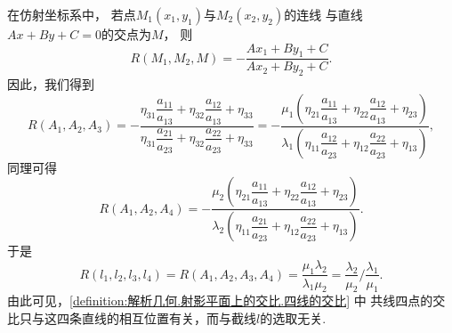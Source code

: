 在仿射坐标系中，
若点\(M_1(x_1,y_1)\)与\(M_2(x_2,y_2)\)的连线
与直线\(A x + B y + C = 0\)的交点为\(M\)，
则\begin{equation*}
	R(M_1,M_2,M)
	= -\frac{A x_1 + B y_1 + C}{A x_2 + B y_2 + C}.
\end{equation*}
因此，我们得到\begin{equation*}
	R(A_1,A_2,A_3)
	= -\frac{\eta_{31} \dfrac{a_{11}}{a_{13}} + \eta_{32} \dfrac{a_{12}}{a_{13}} + \eta_{33}}
			{\eta_{31} \dfrac{a_{21}}{a_{23}} + \eta_{32} \dfrac{a_{22}}{a_{23}} + \eta_{33}}
	= -\frac{\mu_1 \left( \eta_{21} \dfrac{a_{11}}{a_{13}} + \eta_{22} \dfrac{a_{12}}{a_{13}} + \eta_{23} \right)}
			{\lambda_1 \left( \eta_{11} \dfrac{a_{12}}{a_{23}} + \eta_{12} \dfrac{a_{22}}{a_{23}} + \eta_{13} \right)},
\end{equation*}
同理可得\begin{equation*}
	R(A_1,A_2,A_4)
	= -\frac{\mu_2 \left( \eta_{21} \dfrac{a_{11}}{a_{13}} + \eta_{22} \dfrac{a_{12}}{a_{13}} + \eta_{23} \right)}
			{\lambda_2 \left( \eta_{11} \dfrac{a_{21}}{a_{23}} + \eta_{12} \dfrac{a_{22}}{a_{23}} + \eta_{13} \right)}.
\end{equation*}
于是\begin{equation}\label{equation:解析几何.射影平面上的交比.四线的交比1}
	R(l_1,l_2,l_3,l_4)
	= R(A_1,A_2,A_3,A_4)
	= \frac{\mu_1 \lambda_2}{\lambda_1 \mu_2}
	= \frac{\lambda_2}{\mu_2} \bigg/ \frac{\lambda_1}{\mu_1}.
\end{equation}
由此可见，\cref{definition:解析几何.射影平面上的交比.四线的交比} 中
共线四点的交比只与这四条直线的相互位置有关，而与截线\(l\)的选取无关.

